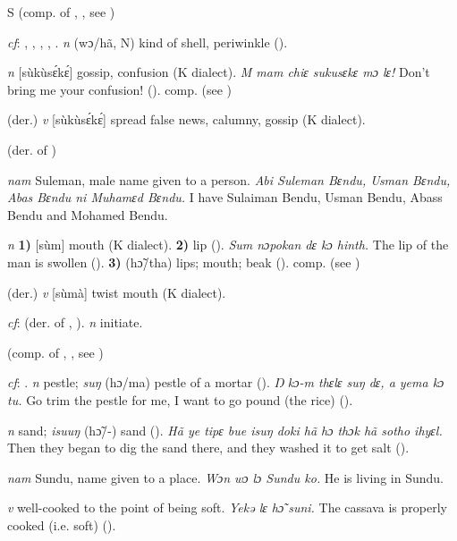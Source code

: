 \begin{letter}{S}
 (comp. of , , see ) 

 \textit{cf}: , , , , . \textit{n} (wɔ/hã, N) kind of shell, periwinkle (\citealt{Pichl1967}). 

 \textit{n} [sùkùsɛ́kɛ́] gossip, confusion (K dialect). \textit{M mam chiɛ sukusɛkɛ mɔ lɛ!} Don't bring me your confusion! (\citealt{Pichl1967}). comp.  (see ) 

 (der.) \textit{v} [sùkùsɛ́kɛ́] spread false news, calumny, gossip (K dialect). 

 (der. of ) 

 \textit{nam} Suleman, male name given to a person. \textit{Abi Suleman Bɛndu, Usman Bɛndu, Abas Bɛndu ni Muhamɛd Bɛndu.} I have Sulaiman Bendu, Usman Bendu, Abass Bendu and Mohamed Bendu.

 \textit{n} \textbf{1)} [sùm] mouth (K dialect). \textbf{2)} lip (\citealt{Sumner1921}). \textit{Sum nɔpokan dɛ kɔ hinth.} The lip of the man is swollen (\citealt{Pichl1967}). \textbf{3)} (hɔ̃/tha) lips; mouth; beak (\citealt{Pichl1967}). comp.  (see ) 

 (der.) \textit{v} [sùmà] twist mouth (K dialect). 

 \textit{cf}:  (der. of , ). \textit{n} initiate.

 (comp. of , , see ) 

 \textit{cf}: . \textit{n} pestle; \textit{suŋ} (hɔ/ma) pestle of a mortar (\citealt{Pichl1967}). \textit{Ŋ kɔ-m thɛlɛ suŋ dɛ, a yema kɔ tu.} Go trim the pestle for me, I want to go pound (the rice) (\citealt{Pichl1967}). 

 \textit{n} sand; \textit{isuuŋ} (hɔ̃/-) sand (\citealt{Pichl1967}). \textit{Hã ye tipɛ bue isuŋ doki hã hɔ thɔk hã sotho ihyɛl.} Then they began to dig the sand there, and they washed it to get salt (\citealt{Pichl1967}).

 \textit{nam} Sundu, name given to a place. \textit{Wɔn wɔ lɔ Sundu ko.} He is living in Sundu.

 \textit{v} well-cooked to the point of being soft. \textit{Yekə lɛ hɔ̃ suni.} The cassava is properly cooked (i.e. soft) (\citealt{Pichl1967}).


\end{letter}
